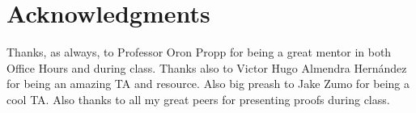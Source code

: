 \documentclass[openany, amssymb, psamsfonts]{amsart}
\theoremstyle{definition}
\numberwithin{equation}{section}
\begin{document}
\section*{Acknowledgments} 
Thanks, as always, to Professor Oron Propp for being a great mentor in both Office Hours and during class. Thanks also to Victor Hugo Almendra Hernández for being an amazing TA and resource. Also big preash to Jake Zumo for being a cool TA. Also thanks to all my great peers for presenting proofs during class.
\begin{thebibliography}{9}




\end{thebibliography}
\end{document}
